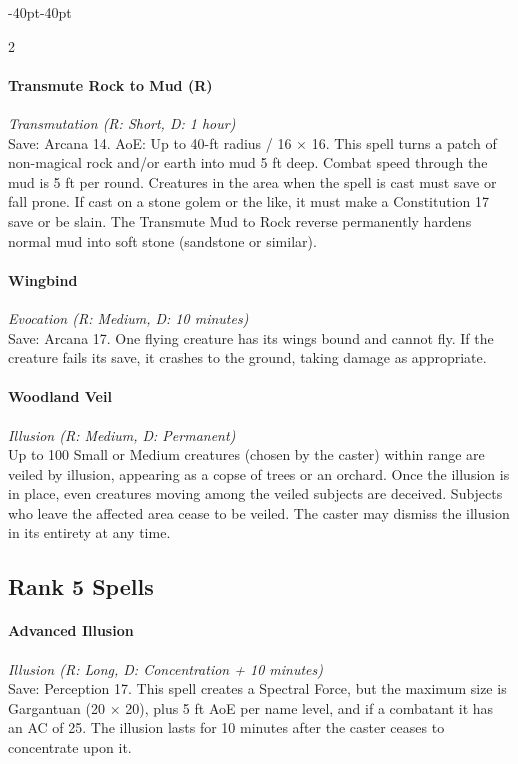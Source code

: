 \documentclass{book}
\begin{document}
\begin{adjustwidth}{-40pt}{-40pt}
\begin{multicols}{2}
\paragraph{Transmute Rock to Mud (R)}\label{transmute-rock-to-mud-r}

\emph{Transmutation (R: Short, D: 1 hour)}\\
Save: Arcana 14. AoE: Up to 40-ft radius / 16 × 16. This spell turns a
patch of non-magical rock and/or earth into mud 5 ft deep. Combat speed
through the mud is 5 ft per round. Creatures in the area when the spell
is cast must save or fall prone. If cast on a stone golem or the like,
it must make a Constitution 17 save or be slain. The Transmute Mud to
Rock reverse permanently hardens normal mud into soft stone (sandstone
or similar).

\paragraph{Wingbind}\label{wingbind}

\emph{Evocation (R: Medium, D: 10 minutes)}\\
Save: Arcana 17. One flying creature has its wings bound and cannot fly.
If the creature fails its save, it crashes to the ground, taking damage
as appropriate.

\paragraph{Woodland Veil}\label{woodland-veil}

\emph{Illusion (R: Medium, D: Permanent)}\\
Up to 100 Small or Medium creatures (chosen by the caster) within range
are veiled by illusion, appearing as a copse of trees or an orchard.
Once the illusion is in place, even creatures moving among the veiled
subjects are deceived. Subjects who leave the affected area cease to be
veiled. The caster may dismiss the illusion in its entirety at any time.

\subsection*{Rank 5 Spells}\label{rank-5-spells}

\paragraph{Advanced Illusion}\label{advanced-illusion}

\emph{Illusion (R: Long, D: Concentration + 10 minutes)}\\
Save: Perception 17. This spell creates a Spectral Force, but the
maximum size is Gargantuan (20 × 20), plus 5 ft AoE per name level, and
if a combatant it has an AC of 25. The illusion lasts for 10 minutes
after the caster ceases to concentrate upon it.


\end{multicols}
\end{adjustwidth}
\end{document}
